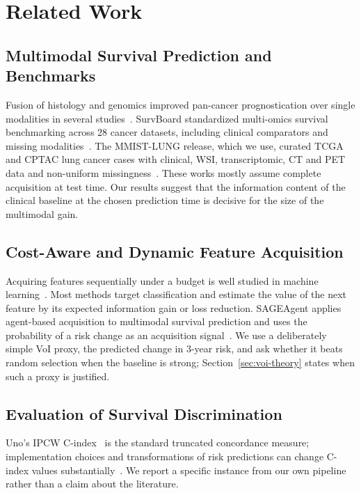 \documentclass[journal,twoside,web]{IEEEtran}
\begin{document}
\section{Related Work}
\subsection{Multimodal Survival Prediction and Benchmarks}
Fusion of histology and genomics improved pan-cancer prognostication over single modalities in several studies~\cite{chen2022,cheerla2019,valesilva2021}. SurvBoard standardized multi-omics survival benchmarking across 28 cancer datasets, including clinical comparators and missing modalities~\cite{wissel2025}. The MMIST-LUNG release, which we use, curated TCGA and CPTAC lung cancer cases with clinical, WSI, transcriptomic, CT and PET data and non-uniform missingness~\cite{mendes_mmist}. These works mostly assume complete acquisition at test time. Our results suggest that the information content of the clinical baseline at the chosen prediction time is decisive for the size of the multimodal gain.

\subsection{Cost-Aware and Dynamic Feature Acquisition}
Acquiring features sequentially under a budget is well studied in machine learning~\cite{ji2007,shim2018,covert2023}. Most methods target classification and estimate the value of the next feature by its expected information gain or loss reduction. SAGEAgent applies agent-based acquisition to multimodal survival prediction and uses the probability of a risk change as an acquisition signal~\cite{qu2026}. We use a deliberately simple VoI proxy, the predicted change in 3-year risk, and ask whether it beats random selection when the baseline is strong; Section~\ref{sec:voi-theory} states when such a proxy is justified.

\subsection{Evaluation of Survival Discrimination}
Uno's IPCW C-index~\cite{uno2011} is the standard truncated concordance measure; implementation choices and transformations of risk predictions can change C-index values substantially~\cite{sonabend2022}. We report a specific instance from our own pipeline rather than a claim about the literature.
\end{document}
